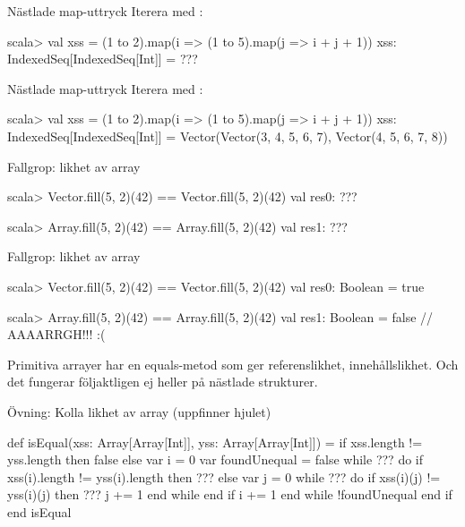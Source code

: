 \begin{Slide}{Nästlade map-uttryck}\SlideFontSmall
Iterera med :\\
\begin{REPL}
scala> val xss = (1 to 2).map(i => (1 to 5).map(j => i + j + 1))
xss: IndexedSeq[IndexedSeq[Int]] =
      ???
\end{REPL}
\end{Slide}

\begin{Slide}{Nästlade map-uttryck}\SlideFontSmall
Iterera med :\\
\begin{REPL}
scala> val xss = (1 to 2).map(i => (1 to 5).map(j => i + j + 1))
xss: IndexedSeq[IndexedSeq[Int]] =
      Vector(Vector(3, 4, 5, 6, 7), Vector(4, 5, 6, 7, 8))
\end{REPL}
\end{Slide}



\ifkompendium\else
\begin{Slide}{Fallgrop: likhet av array}
\begin{REPL}
scala> Vector.fill(5, 2)(42) == Vector.fill(5, 2)(42)
val res0: ???

scala> Array.fill(5, 2)(42) == Array.fill(5, 2)(42)
val res1: ???
\end{REPL}
\end{Slide}
\fi

\begin{Slide}{Fallgrop: likhet av array}
\begin{REPL}
scala> Vector.fill(5, 2)(42) == Vector.fill(5, 2)(42)
val res0: Boolean = true

scala> Array.fill(5, 2)(42) == Array.fill(5, 2)(42)
val res1: Boolean = false  // AAAARRGH!!! :(
\end{REPL}
Primitiva arrayer har en equals-metod som ger referenslikhet,  innehållslikhet. Och det fungerar följaktligen ej heller på nästlade strukturer. 
\end{Slide}

\ifkompendium\else
\begin{Slide}{Övning: Kolla likhet av array (uppfinner hjulet)}
\begin{CodeSmall}
def isEqual(xss: Array[Array[Int]], yss: Array[Array[Int]]) = 
  if xss.length != yss.length then false else
    var i = 0
    var foundUnequal = false
    while ??? do
      if xss(i).length != yss(i).length then 
        ???
      else 
        var j = 0
        while ??? do
          if xss(i)(j) != yss(i)(j) then ???
          j += 1
        end while
      end if
      i += 1
    end while
    !foundUnequal
  end if
end isEqual
\end{CodeSmall}
\end{Slide}
\fi


